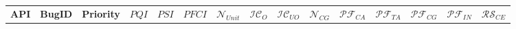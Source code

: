 \begin{table*}[t]
\setlength{\tabcolsep}{4.5pt}
\centering
\scriptsize
\begin{tabular}{l|l|l|l|l|c|c|c|c|c|c|c|c|c|l}
\multicolumn{1}{c|}{\textbf{API}} &
\multicolumn{1}{c|}{\textbf{BugID}} &
\multicolumn{1}{c|}{\textbf{Priority}} &
\multicolumn{1}{c|}{\textbf{$PQI$}} &
\multicolumn{1}{c|}{\textbf{$PSI$}} &
\multicolumn{1}{c|}{\textbf{$PFCI$}} &
\multicolumn{1}{c|}{\textbf{$\mathcal{N}_{Unit}$}} & 
\multicolumn{1}{c|}{\textbf{$\mathcal{IC}_O$}} & %
\multicolumn{1}{c|}{\textbf{$\mathcal{IC}_{UO}$}} & %
\multicolumn{1}{c|}{\textbf{$\mathcal{N}_{CG}$}} &
\multicolumn{1}{c|}{\textbf{$\mathcal{PF}_{CA}$}} & %
\multicolumn{1}{c|}{\textbf{$\mathcal{PF}_{TA}$}} & %
\multicolumn{1}{c|}{\textbf{$\mathcal{PF}_{CG}$}} & %
\multicolumn{1}{c|}{\textbf{$\mathcal{PF}_{IN}$}} & %
\multicolumn{1}{c}{\textbf{$\mathcal{RS}_{CE}$}}\\ %


\end{tabular}
\end{table*}
